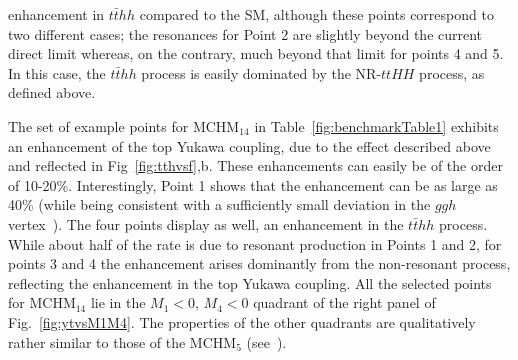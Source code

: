 enhancement in $t\bar{t}hh$ compared to the SM, although these points correspond to two different cases; the resonances for Point 2 are slightly beyond the current direct limit whereas, on the contrary, much beyond that limit for points 4 and 5. In this case, the
$t\bar{t}hh$ process is easily dominated by the NR-$ttHH$ process, as
defined above.  

The set of example points for MCHM$_{14}$ in Table~\ref{fig:benchmarkTable1} exhibits an enhancement of the top Yukawa
coupling, due to the effect described above and reflected in Fig~\ref{fig:tthvsf},b.  These
enhancements can easily be of the order of 10-20\%.  Interestingly,
Point 1 shows that the enhancement can be as large as 40\% (while
being consistent with a sufficiently small deviation in the $ggh$
vertex~\cite{MCHMtthh}). The four points display as well, an enhancement
in the $t\bar{t}hh$ process.  While about half of the rate is due to
resonant production in Points 1 and 2, for points 3 and 4 the
enhancement arises dominantly from the non-resonant process,
reflecting the enhancement in the top Yukawa coupling. All the selected points for MCHM$_{14}$ lie in the
$M_1 < 0$, $M_4 < 0$ quadrant of the right panel of
Fig.~\ref{fig:ytvsM1M4}. The properties of the other quadrants are
qualitatively rather similar to those of the MCHM$_5$ (see~\cite{MCHMtthh}).

